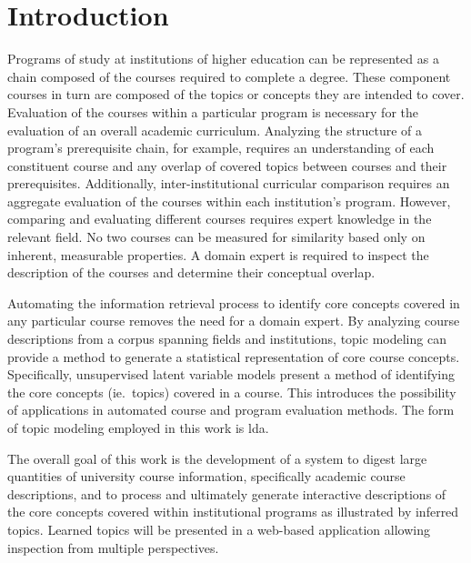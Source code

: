 \section{Introduction}
\label{sec:introduction}


Programs of study at institutions of higher education can be represented as a chain composed of the courses required to complete a degree.
These component courses in turn are composed of the topics or concepts they are intended to cover.
Evaluation of the courses within a particular program is necessary for the evaluation of an overall academic curriculum.
Analyzing the structure of a program's prerequisite chain, for example, requires an understanding of each constituent course and any overlap of covered topics between courses and their prerequisites.
Additionally, inter-institutional curricular comparison requires an aggregate evaluation of the courses within each institution's program.
However, comparing and evaluating different courses requires expert knowledge in the relevant field.
No two courses can be measured for similarity based only on inherent, measurable properties.
A domain expert is required to inspect the description of the courses and determine their conceptual overlap.


Automating the information retrieval process to identify core concepts covered in any particular course removes the need for a domain expert.
By analyzing course descriptions from a corpus spanning fields and institutions, topic modeling can provide a method to generate a statistical representation of core course concepts.
Specifically, unsupervised latent variable models present a method of identifying the core concepts (ie.\ topics) covered in a course.
This introduces the possibility of applications in automated course and program evaluation methods.
The form of topic modeling employed in this work is \acf{lda}.~\cite{Blei2003}


The overall goal of this work is the development of a system to digest large quantities of university course information, specifically academic course descriptions, and to process and ultimately generate interactive descriptions of the core concepts covered within institutional programs as illustrated by inferred topics.
Learned topics will be presented in a web-based application allowing inspection from multiple perspectives.


